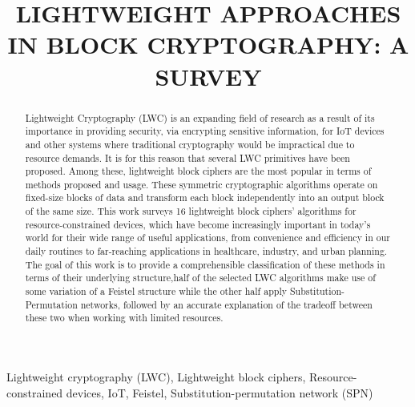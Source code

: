 \documentclass[conference,compsoc]{IEEEtran}
\begin{document}
\title{LIGHTWEIGHT APPROACHES IN BLOCK CRYPTOGRAPHY: A SURVEY}

\author{
}

\maketitle
\begin{abstract}
Lightweight Cryptography (LWC) is an expanding field of research as a result of its importance in providing security, via encrypting sensitive information, for IoT devices and other systems where traditional cryptography would be impractical due to resource demands. It is for this reason that several LWC primitives have been proposed. Among these, lightweight block ciphers are the most popular in terms of methods proposed and usage. These symmetric cryptographic algorithms operate on fixed-size blocks of data and transform each block independently into an output block of the same size. This work surveys 16 lightweight block ciphers' algorithms for resource-constrained devices, which have become increasingly important in today's world for their wide range of useful applications, from convenience and efficiency in our daily routines to far-reaching applications in healthcare, industry, and urban planning. The goal of this work is to provide a comprehensible classification of these methods in terms of their underlying structure,half of the selected LWC algorithms make use of some variation of a Feistel structure while the other half apply Substitution-Permutation networks,  followed by an accurate explanation of the tradeoff between these two when working with limited resources.
\end{abstract}

\begin{IEEEkeywords} Lightweight cryptography (LWC), Lightweight block ciphers, Resource-constrained devices, IoT, Feistel, Substitution-permutation network (SPN)\end{IEEEkeywords}
\end{document}
